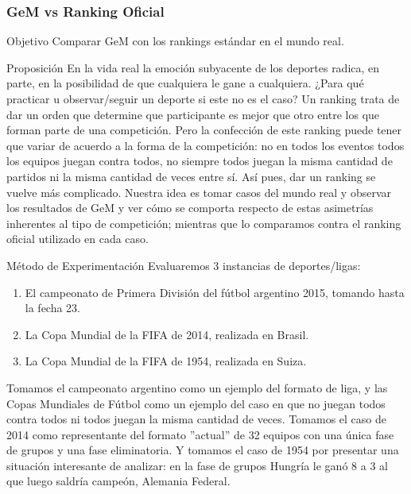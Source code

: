 \subsubsection{GeM vs Ranking Oficial}
\label{subsec:exp6}
\begin{LaTeXdescription}
    \item[Objetivo] Comparar GeM con los rankings estándar en el mundo real.\\

    \item[Proposici\'on] En la vida real la emoción subyacente de los deportes
        radica, en parte, en la posibilidad de que cualquiera le gane a
        cualquiera. ¿Para qué practicar u observar/seguir un deporte si este no
        es el caso?  Un ranking trata de dar un orden que determine que
        participante es mejor que otro entre los que forman parte de una
        competición. Pero la confección de este ranking puede tener que variar
        de acuerdo a la forma de la competición: no en todos los eventos todos
        los equipos juegan contra todos, no siempre todos juegan la misma
        cantidad de partidos ni la misma cantidad de veces entre sí. Así pues,
        dar un ranking se vuelve más complicado. Nuestra idea es tomar casos del
        mundo real y observar los resultados de GeM y ver cómo se comporta
        respecto de estas asimetrías inherentes al tipo de competición; mientras
        que lo comparamos contra el ranking oficial utilizado en cada caso.\\

    \item[M\'etodo de Experimentaci\'on] Evaluaremos 3 instancias de
        deportes/ligas:

        \begin{enumerate}
            \item El campeonato de Primera División del fútbol argentino 2015,
                tomando hasta la fecha 23.

            \item La Copa Mundial de la FIFA de 2014, realizada en Brasil.

            \item La Copa Mundial de la FIFA de 1954, realizada en Suiza.
        \end{enumerate}
        \medskip

        \par Tomamos el campeonato argentino como un ejemplo del formato de
        liga, y las Copas Mundiales de Fútbol como un ejemplo del caso en que no
        juegan todos contra todos ni todos juegan la misma cantidad de veces.
        Tomamos el caso de 2014 como representante del formato ''actual'' de 32
        equipos con una única fase de grupos y una fase eliminatoria. Y tomamos
        el caso de 1954 por presentar una situación interesante de analizar: en
        la fase de grupos Hungría le ganó 8 a 3 al que luego saldría campeón,
        Alemania Federal.


\end{LaTeXdescription}

